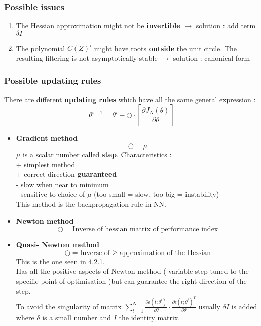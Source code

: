 \subsubsection{Possible issues}
\begin{enumerate}
\item The Hessian approximation might not be \textbf{invertible} $\to$ solution : add term $\delta I$
\item The polynomial $C(Z)^i$ might have roots \textbf{outside} the unit circle. The resulting filtering is not asymptotically stable $\to$ solution : canonical form
\end{enumerate}







\subsubsection{Possible updating rules}
There are different \textbf{updating rules} which have all the same general expression : 
\[
\boxed{\theta^{i+1} = \theta^i - \bigcirc  \cdot \left[ \frac{\partial{J_N(\theta)}}{\partial{\theta}}\right]}
\] 

\begin{itemize}
\item \textbf{Gradient method}\\
$$ \bigcirc = \mu $$  $\mu$ is a scalar number called \textbf{step}.
Characteristics :\\
+ simplest method\\
+ correct direction \textbf{guaranteed}\\
- slow when near to minimum\\
- sensitive to choice of $\mu$ (too small = slow, too big = instability)\\
This method is the backpropagation rule in NN.
\item \textbf{Newton method}\\
$$ \bigcirc = \text{Inverse of hessian matrix of performance index} $$ 
\item \textbf{Quasi- Newton method}\\
$$ \bigcirc = \text{Inverse of} \geq \text{approximation of the Hessian} $$ 
This is the one seen in 4.2.1.\\
Has all the positive aspects of Newton method ( variable step tuned to the specific point of optimisation )but can guarantee the right direction of the step.\\
To avoid the singularity of matrix $ \sum\limits_{t=1}^{N} \frac{\partial \epsilon(t;\theta^i)}{\partial{\theta}} \cdot \frac{\partial \epsilon(t;\theta^i)^T}{\partial{\theta}} $ usually $\delta I$ is added where $\delta$ is a small number and $I$ the identity matrix. 
\end{itemize}